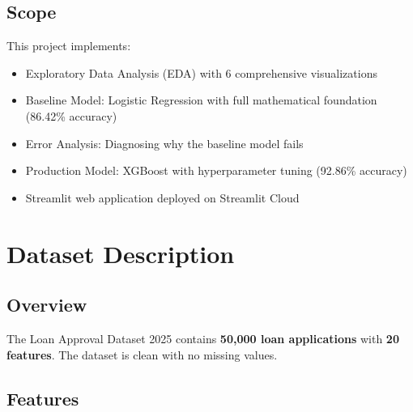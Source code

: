 \documentclass[12pt,a4paper]{article}
\begin{document}
\subsection{Scope}

This project implements:
\begin{itemize}
    \item Exploratory Data Analysis (EDA) with 6 comprehensive visualizations
    \item Baseline Model: Logistic Regression with full mathematical foundation (86.42\% accuracy)
    \item Error Analysis: Diagnosing why the baseline model fails
    \item Production Model: XGBoost with hyperparameter tuning (92.86\% accuracy)
    \item Streamlit web application deployed on Streamlit Cloud
\end{itemize}

\newpage

\section{Dataset Description}

\subsection{Overview}

The Loan Approval Dataset 2025 contains \textbf{50,000 loan applications} with \textbf{20 features}. The dataset is clean with no missing values.

\subsection{Features}
\end{document}
